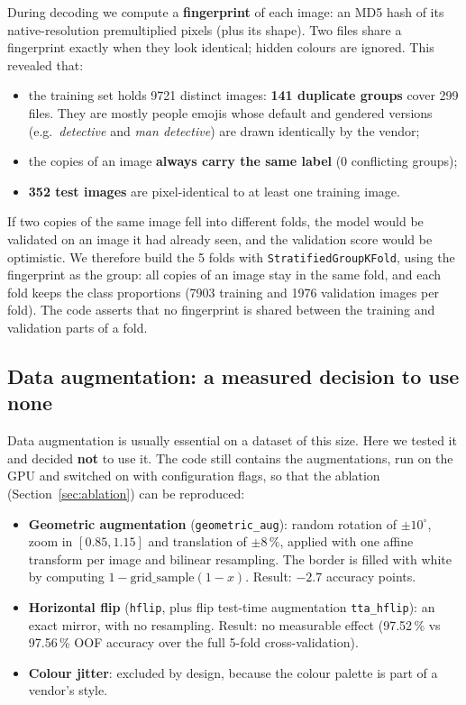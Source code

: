 \documentclass[11pt,a4paper]{article}
\newcommand{\code}[1]{\texttt{\small #1}}
\newcommand{\down}[1]{\textcolor{bad}{#1}}
\begin{document}
During decoding we compute a \textbf{fingerprint} of each image: an MD5 hash of its native-resolution
premultiplied pixels (plus its shape). Two files share a fingerprint exactly when they look identical;
hidden colours are ignored. This revealed that:
\begin{itemize}
  \item the training set holds \num{9721} distinct images: \textbf{141 duplicate groups} cover 299
  files. They are mostly people emojis whose default and gendered versions (e.g.\ \emph{detective} and
  \emph{man detective}) are drawn identically by the vendor;
  \item the copies of an image \textbf{always carry the same label} (0 conflicting groups);
  \item \textbf{352 test images} are pixel-identical to at least one training image.
\end{itemize}
If two copies of the same image fell into different folds, the model would be validated on an image it
had already seen, and the validation score would be optimistic. We therefore build the 5 folds with
\code{StratifiedGroupKFold}, using the fingerprint as the group: all copies of an image stay in the same
fold, and each fold keeps the class proportions (\num{7903} training and \num{1976} validation images per
fold). The code asserts that no fingerprint is shared between the training and validation parts of a fold.

\subsection{Data augmentation: a measured decision to use none}
\label{sec:augm}

Data augmentation is usually essential on a dataset of this size. Here we tested it and decided
\textbf{not} to use it. The code still contains the augmentations, run on the GPU and switched on with
configuration flags, so that the ablation (Section~\ref{sec:ablation}) can be reproduced:

\begin{itemize}
  \item \textbf{Geometric augmentation} (\code{geometric\_aug}): random rotation of $\pm10^\circ$, zoom
  in $[0.85,1.15]$ and translation of $\pm8\,\%$, applied with one affine transform per image and
  bilinear resampling. The border is filled with white by computing $1-\text{grid\_sample}(1-x)$.
  Result: \down{$-2.7$ accuracy points}.
  \item \textbf{Horizontal flip} (\code{hflip}, plus flip test-time augmentation \code{tta\_hflip}): an
  exact mirror, with no resampling. Result: no measurable effect (97.52\,\% vs 97.56\,\% OOF accuracy
  over the full 5-fold cross-validation).
  \item \textbf{Colour jitter}: excluded by design, because the colour palette is part of a vendor's
  style.
\end{itemize}
\end{document}
